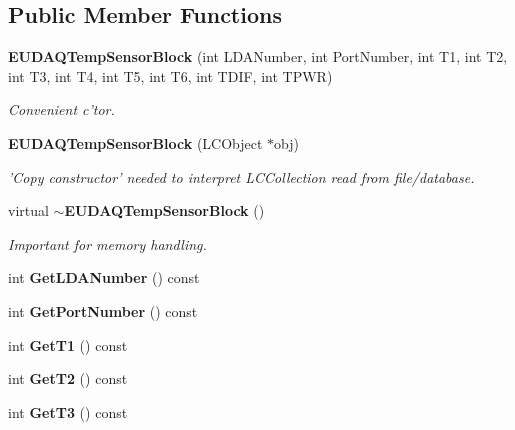 \subsection*{Public Member Functions}
\begin{DoxyCompactItemize}
\item 
{\bf E\-U\-D\-A\-Q\-Temp\-Sensor\-Block} (int L\-D\-A\-Number, int Port\-Number, int T1, int T2, int T3, int T4, int T5, int T6, int T\-D\-I\-F, int T\-P\-W\-R)\label{classCALICE_1_1EUDAQTempSensorBlock_ae02d2597a925e3e7fd290a0b31d685c3}

\begin{DoxyCompactList}\small\item\em Convenient c'tor. \end{DoxyCompactList}\item 
{\bf E\-U\-D\-A\-Q\-Temp\-Sensor\-Block} (L\-C\-Object $\ast$obj)\label{classCALICE_1_1EUDAQTempSensorBlock_ac20c9533a2640ee57f741cfca85937eb}

\begin{DoxyCompactList}\small\item\em 'Copy constructor' needed to interpret L\-C\-Collection read from file/database. \end{DoxyCompactList}\item 
virtual {\bf $\sim$\-E\-U\-D\-A\-Q\-Temp\-Sensor\-Block} ()\label{classCALICE_1_1EUDAQTempSensorBlock_a482b674c4674680f57ad441d32d3e7f6}

\begin{DoxyCompactList}\small\item\em Important for memory handling. \end{DoxyCompactList}\item 
int {\bfseries Get\-L\-D\-A\-Number} () const \label{classCALICE_1_1EUDAQTempSensorBlock_ae2f5861ac123e152117d8086d260ed28}

\item 
int {\bfseries Get\-Port\-Number} () const \label{classCALICE_1_1EUDAQTempSensorBlock_aa85c8473e68609696ef73732ce2e1c73}

\item 
int {\bfseries Get\-T1} () const \label{classCALICE_1_1EUDAQTempSensorBlock_a05f7d3cd2f61b94b7b355dad9ed04e71}

\item 
int {\bfseries Get\-T2} () const \label{classCALICE_1_1EUDAQTempSensorBlock_a57fceddca009de039005ae35728279bf}

\item 
int {\bfseries Get\-T3} () const \label{classCALICE_1_1EUDAQTempSensorBlock_abfa60426a963bcd31243be0e472451bd}


\end{DoxyCompactItemize}
